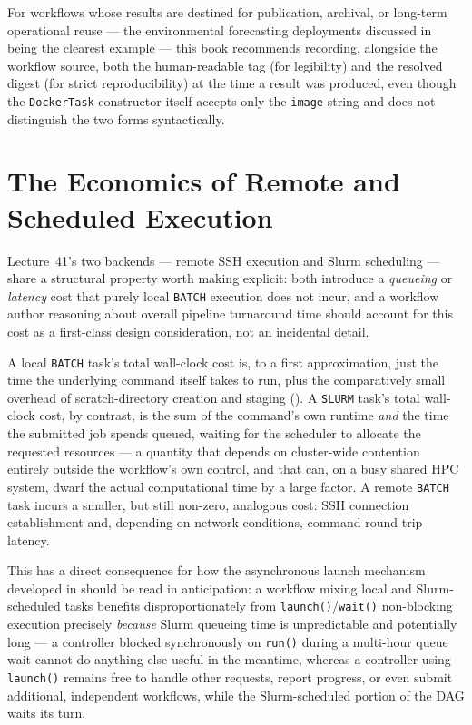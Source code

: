 \begin{practicebox}
For workflows whose results are destined for publication, archival, or
long-term operational reuse --- the environmental forecasting deployments
discussed in  being the clearest example --- this book
recommends recording, alongside the workflow source, both the human-readable
tag (for legibility) and the resolved digest (for strict reproducibility) at
the time a result was produced, even though the \texttt{DockerTask}
constructor itself accepts only the \texttt{image} string and does not
distinguish the two forms syntactically.
\end{practicebox}

\section{The Economics of Remote and Scheduled Execution}

Lecture~41's two backends --- remote SSH execution and Slurm scheduling ---
share a structural property worth making explicit: both introduce a
\emph{queueing} or \emph{latency} cost that purely local \texttt{BATCH}
execution does not incur, and a workflow author reasoning about overall
pipeline turnaround time should account for this cost as a first-class
design consideration, not an incidental detail.

A local \texttt{BATCH} task's total wall-clock cost is, to a first
approximation, just the time the underlying command itself takes to run,
plus the comparatively small overhead of scratch-directory creation and
staging (). A \texttt{SLURM} task's total wall-clock
cost, by contrast, is the sum of the command's own runtime \emph{and} the
time the submitted job spends queued, waiting for the scheduler to allocate
the requested resources --- a quantity that depends on cluster-wide
contention entirely outside the workflow's own control, and that can, on a
busy shared HPC system, dwarf the actual computational time by a large
factor. A remote \texttt{BATCH} task incurs a smaller, but still non-zero,
analogous cost: SSH connection establishment and, depending on network
conditions, command round-trip latency.

\begin{practicebox}
This has a direct consequence for how the asynchronous launch mechanism
developed in  should be read in anticipation: a
workflow mixing local and Slurm-scheduled tasks benefits disproportionately
from \texttt{launch()}/\texttt{wait()} non-blocking execution precisely
\emph{because} Slurm queueing time is unpredictable and potentially long ---
a controller blocked synchronously on \texttt{run()} during a multi-hour
queue wait cannot do anything else useful in the meantime, whereas a
controller using \texttt{launch()} remains free to handle other requests,
report progress, or even submit additional, independent workflows, while
the Slurm-scheduled portion of the DAG waits its turn.
\end{practicebox}

